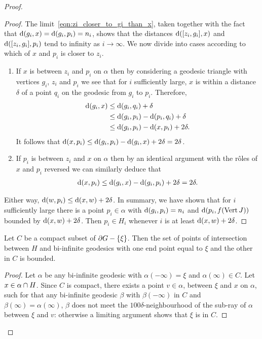 \documentclass[a4paper]{article}
\begin{document}
\begin{proof}
\begin{proof}
  The limit~\eqref{eqn:zi_closer_to_gi_than_x}, taken together with the fact
  that $\operatorname{d}(g_i, x) = \operatorname{d}(g_i, p_i) = n_i$, shows that the distances
  $\operatorname{d}([z_i, g_i], x)$ and $\operatorname{d}([z_i, g_i], p_i)$ tend to infinity as
  $i\to\infty$.  We now divide into cases according to which of $x$ and $p_i$
  is closer to $z_i$.
  \begin{enumerate}
    \item If $x$ is between $z_i$ and $p_i$ on $\alpha$ then by considering a
      geodesic triangle with vertices $g_i$, $z_i$ and $p_i$ we see that for
      $i$ sufficiently large, $x$ is within a distance $\delta$ of a point
      $q_i$ on the geodesic from $g_i$ to $p_i$.  Therefore,
      \begin{align*}
        \operatorname{d}(g_i,x)&\leq \operatorname{d}(g_i,q_i)+\delta\\
                        &\leq \operatorname{d}(g_i,p_i)-\operatorname{d}(p_i,q_i)+\delta\\
                        &\leq \operatorname{d}(g_i,p_i)-\operatorname{d}(x,p_i)+2\delta.
      \end{align*}
      It follows that $\operatorname{d}(x,p_i) \leq \operatorname{d}(g_i,p_i)-\operatorname{d}(g_i,x)+2\delta
      = 2\delta$.
    \item If $p_i$ is between $z_i$ and $x$ on $\alpha$ then by an identical 
      argument with the r\^oles of $x$ and $p_i$ reversed we can similarly 
      deduce that 
      \begin{align*}
        \operatorname{d}(x,p_i)\leq\operatorname{d}(g_i,x) - \operatorname{d}(g_i,p_i) + 2\delta =2\delta.
      \end{align*}
  \end{enumerate}

  Either way, $\operatorname{d}(w, p_i) \leq \operatorname{d}(x,w) + 2\delta$. In summary, we have
  shown that for $i$ sufficiently large there is a point $p_i\in\alpha$ with
  $\operatorname{d}(g_i,p_i)=n_i$ and $\operatorname{d}(p_i,f(\operatorname{Vert} J))$ bounded by $\operatorname{d}(x,w) +
  2\delta$. Then $p_i \in H_i$ whenever $i$ is at least $\operatorname{d}(x,w) + 2\delta$.
\end{proof}

\begin{lemma}\label{lem:boundedintersection}
  Let $C$ be a compact subset of $\partial G - \left\{\xi\right\}$. Then the set of points 
  of intersection between $H$ and bi-infinite geodesics with one end point equal 
  to $\xi$ and the other in $C$ is bounded.
\end{lemma}

\begin{proof}
  Let $\alpha$ be any bi-infinite geodesic with $\alpha(-\infty)=\xi$ and 
  $\alpha(\infty)\in C$. Let $x \in \alpha \cap H$. Since $C$ is
  compact, there exists a point $v \in \alpha$, between $\xi$ and $x$ on
  $\alpha$, such for that any bi-infinite geodesic $\beta$ with
  $\beta(-\infty)$ in $C$ and $\beta(\infty) = \alpha(\infty)$, $\beta$ does
  not meet the $100\delta$-neighbourhood of the sub-ray of $\alpha$ between
  $\xi$ and $v$: otherwise a limiting argument shows that $\xi$ is in $C$.


\end{proof}
\end{proof}
\end{document}

